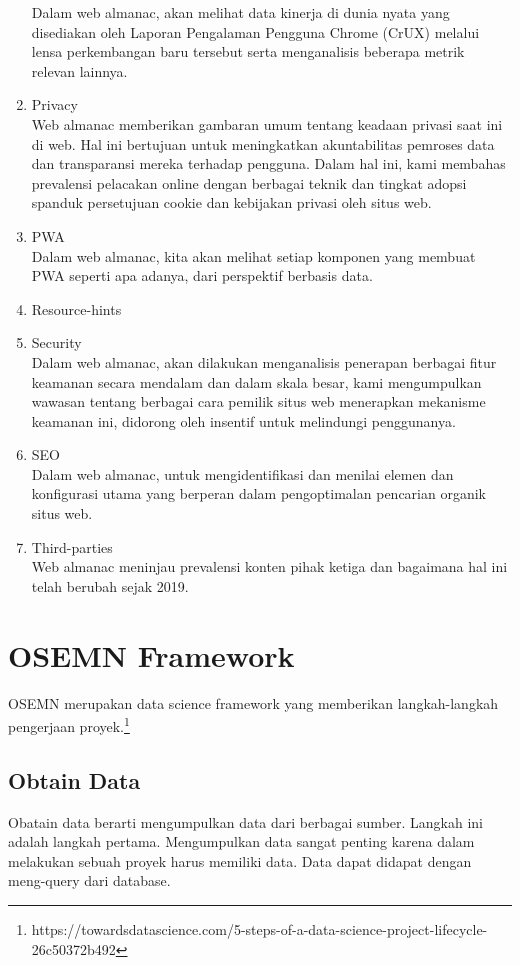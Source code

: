 \begin{enumerate}
	Dalam web almanac, akan melihat data kinerja di dunia nyata yang disediakan oleh Laporan Pengalaman Pengguna Chrome (CrUX) melalui lensa perkembangan baru tersebut serta menganalisis beberapa metrik relevan lainnya.
	\item Privacy\\
	Web almanac memberikan gambaran umum tentang keadaan privasi saat ini di web. Hal ini bertujuan untuk meningkatkan akuntabilitas pemroses data dan transparansi mereka terhadap pengguna. Dalam hal ini, kami membahas prevalensi pelacakan online dengan berbagai teknik dan tingkat adopsi spanduk persetujuan cookie dan kebijakan privasi oleh situs web.
	\item PWA\\
	Dalam web almanac, kita akan melihat setiap komponen yang membuat PWA seperti apa adanya, dari perspektif berbasis data.
	\item Resource-hints\\
	
	\item Security\\
	Dalam web almanac, akan dilakukan menganalisis penerapan berbagai fitur keamanan secara mendalam dan dalam skala besar, kami mengumpulkan wawasan tentang berbagai cara pemilik situs web menerapkan mekanisme keamanan ini, didorong oleh insentif untuk melindungi penggunanya.
	\item SEO\\
	Dalam web almanac, untuk mengidentifikasi dan menilai elemen dan konfigurasi utama yang berperan dalam pengoptimalan pencarian organik situs web.
	\item Third-parties\\
	Web almanac meninjau prevalensi konten pihak ketiga dan bagaimana hal ini telah berubah sejak 2019.
\end{enumerate}



\section{OSEMN Framework}
OSEMN merupakan data science framework yang memberikan langkah-langkah pengerjaan proyek.\footnote{https://towardsdatascience.com/5-steps-of-a-data-science-project-lifecycle-26c50372b492}
\subsection{Obtain Data}
Obatain data berarti mengumpulkan data dari berbagai sumber. Langkah ini adalah langkah pertama. Mengumpulkan data sangat penting karena dalam melakukan sebuah proyek harus memiliki data. Data dapat didapat dengan meng-query dari database.


